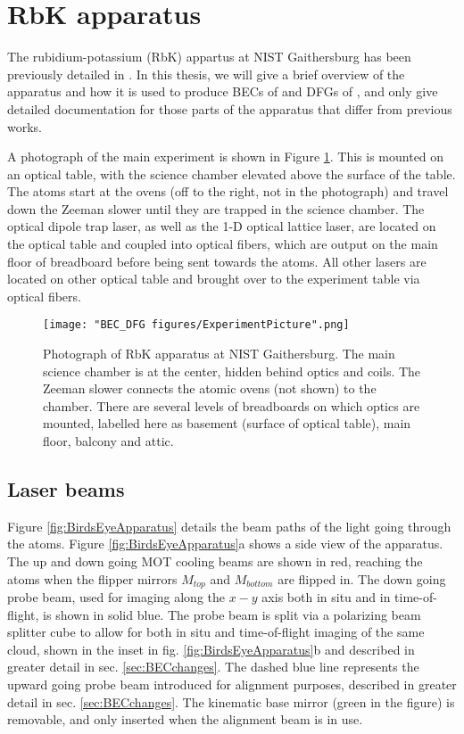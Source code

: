 \section{RbK apparatus}\label{sec:RbK}

The rubidium-potassium (RbK) appartus at NIST Gaithersburg has been previously detailed in \cite{Lin2009,KarinaThesis, AycockThesis}. In this thesis, we will give a brief overview of the apparatus and how it is used to produce BECs of \Rb{} and DFGs of \K{}, and only give detailed documentation for those parts of the apparatus that differ from previous works. 

A photograph of the main experiment is shown in Figure \ref{fig:ExperimentPicture}. This is mounted on an optical table, with the science chamber elevated above the surface of the table. The atoms start at the ovens (off to the right, not in the photograph) and travel down the Zeeman slower until they are trapped in the science chamber. The optical dipole trap laser, as well as the 1-D optical lattice laser, are located on the optical table and coupled into optical fibers, which are output on the main floor of breadboard before being sent towards the atoms. All other lasers are located on other optical table and brought over to the experiment table via optical fibers. 

\begin{figure}
	\texttt{[image: "BEC\_DFG figures/ExperimentPicture".png]}
\caption[Photograph of RbK apparatus at NIST Gaithersburg]{Photograph of RbK apparatus at NIST Gaithersburg. The main science chamber is at the center, hidden behind optics and coils. The Zeeman slower connects the atomic ovens (not shown) to the chamber. There are several levels of breadboards on which optics are mounted, labelled here as basement (surface of optical table), main floor, balcony and attic.}
\label{fig:ExperimentPicture}
\end{figure}

\subsection{Laser beams}\label{sec:laserBeams}
Figure \ref{fig:BirdsEyeApparatus} details the beam paths of the light going through the atoms. Figure \ref{fig:BirdsEyeApparatus}a shows a side view of the apparatus. The up and down going MOT cooling beams are shown in red, reaching the atoms when the flipper mirrors $M_{top}$ and $M_{bottom}$ are flipped in. The down going probe beam, used for imaging along the $x-y$ axis both in situ and in time-of-flight, is shown in solid blue. The probe beam is split via a polarizing beam splitter cube to allow for both in situ and time-of-flight imaging of the same cloud, shown in the inset in fig.  \ref{fig:BirdsEyeApparatus}b and described in greater detail in sec. \ref{sec:BECchanges}.  The dashed blue line represents the upward going probe beam introduced for alignment purposes, described in greater detail in sec. \ref{sec:BECchanges}. The kinematic base mirror (green in the figure) is removable, and only inserted when the alignment beam is in use. 

